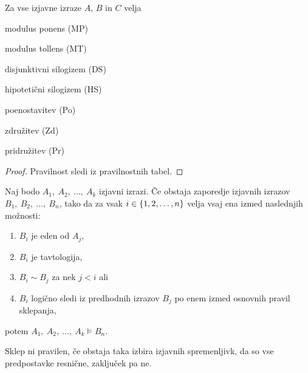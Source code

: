 \documentclass[12pt, a4paper]{article}
\renewcommand{\implies}{\Rightarrow}
\begin{document}
\begin{trditev}
Za vse izjavne izraze $A$, $B$ in $C$ velja

\begin{description}[align=left, labelwidth=\widthof{$A\implies B,~B\implies C \models A\implies CAA$}]
\item[$A,~A\implies B \models B$] modulus ponens (MP)
\item[$A\implies B,~\neg B \models \neg A$] modulus tollens (MT)
\item[$A\lor B,~\neg B \models A$] disjunktivni silogizem (DS)
\item[$A\implies B,~B\implies C \models A\implies C$] hipotetični silogizem (HS)
\item[$A\land B \models A$] poenostavitev (Po)
\item[$A,~B \models A\land B$] združitev (Zd)
\item[$A \models A\lor B$] pridružitev (Pr)
\end{description}
\end{trditev}

\begin{proof}
Pravilnost sledi iz pravilnostnih tabel.
\end{proof}

\begin{izrek}
Naj bodo $A_1,~A_2,~\dots,~A_k$ izjavni izrazi. Če obstaja zaporedje izjavnih izrazov $B_1,~B_2,~\dots,~B_n$, tako da za vsak $i\in\left\{1,2,\dots,n\right\}$ velja vsaj ena izmed naslednjih možnosti:

\begin{enumerate}[label=\alph*)]
\item $B_i$ je eden od $A_j$,
\item $B_i$ je tavtologija,
\item $B_i\sim B_j$ za nek $j<i$ ali
\item $B_i$ logično sledi iz predhodnih izrazov $B_j$ po enem izmed osnovnih pravil sklepanja,
\end{enumerate}

potem $A_1,~A_2,~\dots,~A_k\models B_n$.
\end{izrek}

\obvs

Sklep ni pravilen, če obstaja taka izbira izjavnih spremenljivk, da so vse predpostavke resnične, zaključek pa ne.
\end{document}
